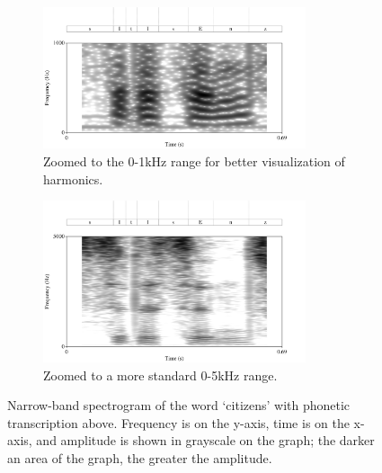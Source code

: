 \DIFdelbegin %
\DIFdelend \DIFaddbegin \begin{figure}[H]
\begin{subfigure}{\textwidth}
  \DIFaddendFL \centering
  \DIFdelbeginFL %
\DIFdelendFL \DIFaddbeginFL \includegraphics[width=0.85\textwidth]{figure/spctgrm1k.png}
  \DIFaddendFL \caption{Zoomed to the 0-1kHz range for better visualization of harmonics.}
  \label{fig:spctgrm_citizen_1k}
\end{subfigure}%
\hfill
\begin{subfigure}{0.95\textwidth}
  \centering
  \DIFdelbeginFL %
\DIFdelendFL \DIFaddbeginFL \includegraphics[width=0.85\textwidth]{figure/spctgrm5k.png}
  \DIFaddendFL \caption{Zoomed to a more standard 0-5kHz range.}
  \label{fig:spctgrm_citizen_5k}
\end{subfigure}
\caption{Narrow-band spectrogram of the word `citizens' with phonetic transcription above.  Frequency is on the y-axis, time is on the x-axis, and amplitude is shown in grayscale on the graph; the darker an area of the graph, the greater the amplitude.}
\label{fig:spctgrm_citizen}
\end{figure}

